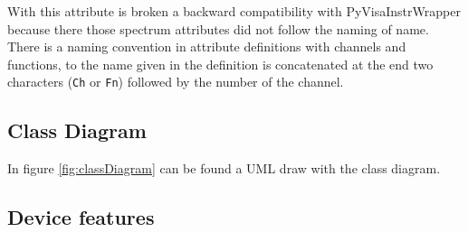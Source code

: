 \documentclass[a4paper,10pt]{article}
\begin{document}
With this attribute is broken a backward compatibility with PyVisaInstrWrapper because there those spectrum attributes did not follow the naming of name. There is a naming convention in attribute definitions with channels and functions, to the name given in the definition is concatenated at the end two characters ({\tt Ch} or {\tt Fn}) followed by the number of the channel.

\subsection{Class Diagram}

In figure \ref{fig:classDiagram} can be found a UML draw with the class diagram.

\begin{figure}[h!]
\end{figure}

\subsection{Device features}
\end{document}
